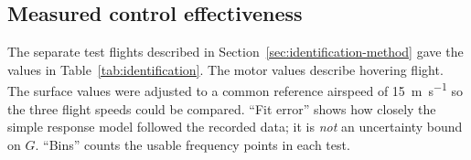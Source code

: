 \documentclass{article}
\begin{document}




\subsection{Measured control effectiveness}
\label{sec:results-identification}
\label{sec:results-yaw}
The separate test flights described in Section~\ref{sec:identification-method} gave the values in Table~\ref{tab:identification}. The motor values describe hovering flight. The surface values were adjusted to a common reference airspeed of \SI{15}{\meter\per\second} so the three flight speeds could be compared. ``Fit error'' shows how closely the simple response model followed the recorded data; it is \emph{not} an uncertainty bound on $G$. ``Bins'' counts the usable frequency points in each test.
\end{document}

